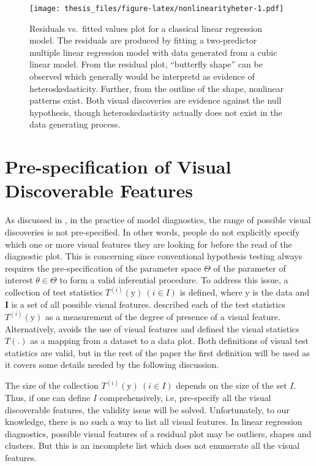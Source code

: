 \documentclass{monashthesis}
\begin{document}
\begin{figure}
\centering
\texttt{[image: thesis\_files/figure-latex/nonlinearityheter-1.pdf]}
\caption{\label{fig:nonlinearityheter}Residuals vs.~fitted values plot for a classical linear regression model. The residuals are produced by fitting a two-predictor multiple linear regression model with data generated from a cubic linear model. From the residual plot, ``butterfly shape'' can be observed which generally would be interpretd as evidence of heteroskedasticity. Further, from the outline of the shape, nonlinear patterns exist. Both visual discoveries are evidence against the null hypothesis, though heteroskedasticity actually does not exist in the data generating process.}
\end{figure}

\hypertarget{pre-specification-of-visual-discoverable-features}{%
\section{Pre-specification of Visual Discoverable Features}\label{pre-specification-of-visual-discoverable-features}}

As discussed in \textcite{buja_statistical_2009}, in the practice of model diagnostics, the range of possible visual discoveries is not pre-specified. In other words, people do not explicitly specify which one or more visual features they are looking for before the read of the diagnostic plot. This is concerning since conventional hypothesis testing always requires the pre-specification of the parameter space \(\Theta\) of the parameter of interest \(\theta \in \Theta\) to form a valid inferential procedure. To address this issue, a collection of test statistics \(T^{(i)}(\boldsymbol{\mathrm{y}})~(i \in I)\) is defined, where \(\boldsymbol{\mathrm{y}}\) is the data and \(\boldsymbol{I}\) is a set of all possible visual features. \textcite{buja_statistical_2009} described each of the test statistics \(T^{(i)}(\boldsymbol{\mathrm{y}})\) as a measurement of the degree of presence of a visual feature. Alternatively, \textcite{majumder_validation_2013} avoids the use of visual features and defined the visual statistics \(T(.)\) as a mapping from a dataset to a data plot. Both definitions of visual test statistics are valid, but in the rest of the paper the first definition will be used as it covers some details needed by the following discussion.

The size of the collection \(T^{(i)}(\boldsymbol{\mathrm{y}})~(i \in I)\) depends on the size of the set \(I\). Thus, if one can define \(I\) comprehensively, i.e, pre-specify all the visual discoverable features, the validity issue will be solved. Unfortunately, to our knowledge, there is no such a way to list all visual features. In linear regression diagnostics, possible visual features of a residual plot may be outliers, shapes and clusters. But this is an incomplete list which does not enumerate all the visual features.
\end{document}
